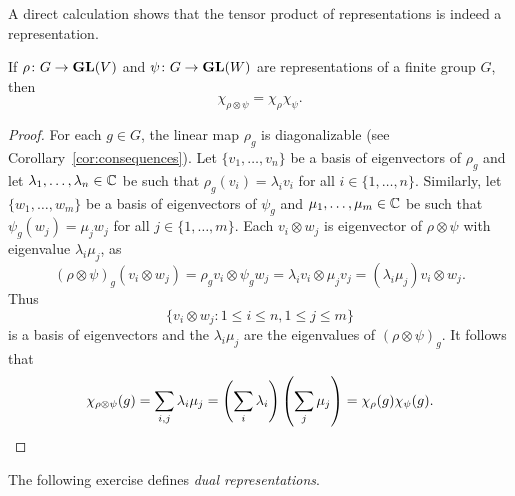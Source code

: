 A direct calculation shows that the tensor product of representations is indeed a representation. 

\begin{proposition}
  	If $\rho\colon G\to\mathbf{GL}(V)$ and
    $\psi\colon G\to\mathbf{GL}(W)$ are representations of a finite group $G$, then
    \[
    \chi_{\rho\otimes\psi}=\chi_\rho\chi_\psi.
    \]
\end{proposition}

\begin{proof}
	For each $g\in G$, the linear map $\rho_g$ is diagonalizable (see Corollary~\ref{cor:consequences}). Let $\{v_1,\dots,v_n\}$
	be a basis of eigenvectors of $\rho_g$ and let $\lambda_1,\dots,\lambda_n\in\mathbb{C}$ be such that
	$\rho_g(v_i)=\lambda_iv_i$ for all $i\in\{1,\dots,n\}$. Similarly, 
	let $\{w_1,\dots,w_m\}$ be a basis of 
	eigenvectors of $\psi_g$ and $\mu_1,\dots,\mu_m\in\mathbb{C}$ be such that $\psi_g(w_j)=\mu_jw_j$ for all $j\in\{1,\dots,m\}$. Each 
	$v_i\otimes w_j$ is eigenvector of $\rho\otimes\psi$ with eigenvalue 
	$\lambda_i\mu_j$, as  
	\[
		(\rho\otimes\psi)_g(v_i\otimes w_j)=\rho_gv_i\otimes \psi_gw_j=\lambda_iv_i\otimes \mu_jv_j=(\lambda_i\mu_j)v_i\otimes w_j.
	\]
	Thus  
	\[
    \{v_i\otimes w_j:1\leq i\leq n,1\leq j\leq m\}
    \]
    is a basis of eigenvectors and the 
	$\lambda_i\mu_j$ are the eigenvalues of $(\rho\otimes\psi)_g$. It follows that 
	\[
	\chi_{\rho\otimes\psi}(g)
	=\sum_{i,j}\lambda_i\mu_j
	=\left(\sum_i\lambda_i\right)\left(\sum_j\mu_j\right)
	=\chi_\rho(g)\chi_\psi(g).\qedhere 
	\]
\end{proof}

The following exercise defines \emph{dual representations}. 

